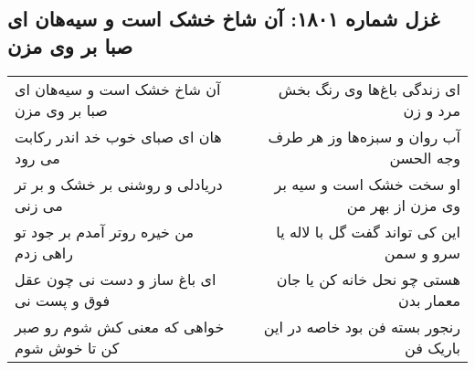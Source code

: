 \begin{center}
\section*{غزل شماره ۱۸۰۱: آن شاخ خشک است و سیه‌هان ای صبا بر وی مزن}
\label{sec:1801}
\begin{longtable}{l p{0.5cm} r}
آن شاخ خشک است و سیه‌هان ای صبا بر وی مزن
&&
ای زندگی باغ‌ها وی رنگ بخش مرد و زن
\\
هان ای صبای خوب خد اندر رکابت می رود
&&
آب روان و سبزه‌ها وز هر طرف وجه الحسن
\\
دریادلی و روشنی بر خشک و بر تر می زنی
&&
او سخت خشک است و سیه بر وی مزن از بهر من
\\
من خیره روتر آمدم بر جود تو راهی زدم
&&
این کی تواند گفت گل با لاله یا سرو و سمن
\\
ای باغ ساز و دست نی چون عقل فوق و پست نی
&&
هستی چو نحل خانه کن یا جان معمار بدن
\\
خواهی که معنی کش شوم رو صبر کن تا خوش شوم
&&
رنجور بسته فن بود خاصه در این باریک فن
\\
\end{longtable}
\end{center}
